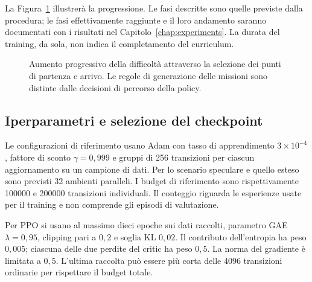 La Figura~\ref{fig:metodo-curriculum} illustrerà la progressione. Le fasi descritte sono quelle previste dalla procedura; le fasi effettivamente raggiunte e il loro andamento saranno documentati con i risultati nel Capitolo~\ref{chap:experiments}. La durata del training, da sola, non indica il completamento del curriculum.

\begin{figure}[tbp]
    \centering
    \caption[Curriculum delle missioni di navigazione]{Aumento progressivo della difficoltà attraverso la selezione dei punti di partenza e arrivo. Le regole di generazione delle missioni sono distinte dalle decisioni di percorso della policy.}
    \label{fig:metodo-curriculum}
\end{figure}

\subsection{Iperparametri e selezione del checkpoint}

Le configurazioni di riferimento usano Adam con tasso di apprendimento $3\times10^{-4}$, fattore di sconto $\gamma=0{,}999$ e gruppi di 256 transizioni per ciascun aggiornamento su un campione di dati. Per lo scenario speculare e quello esteso sono previsti 32 ambienti paralleli. I budget di riferimento sono rispettivamente 100000 e 200000 transizioni individuali. Il conteggio riguarda le esperienze usate per il training e non comprende gli episodi di valutazione.

Per PPO si usano al massimo dieci epoche sui dati raccolti, parametro GAE $\lambda=0{,}95$, clipping pari a $0{,}2$ e soglia KL $0{,}02$. Il contributo dell'entropia ha peso $0{,}005$; ciascuna delle due perdite del critic ha peso $0{,}5$. La norma del gradiente è limitata a $0{,}5$. L'ultima raccolta può essere più corta delle 4096 transizioni ordinarie per rispettare il budget totale.

